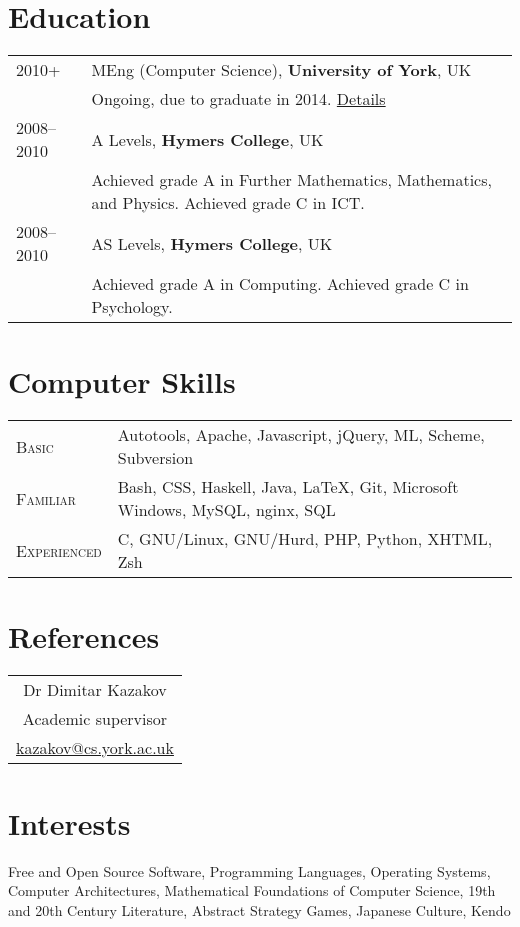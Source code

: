 \documentclass[a4paper,10pt]{article}
\newcommand{\mhref}[1]{\href{mailto:#1}{#1}}
\newenvironment{cvtable}{\begin{tabular}{x{2cm}|p{11.6cm}}}{\end{tabular}}
\newcommand{\rowhead}[1]{\textsc{#1} &}
\newcommand{\rowdetail}[1]{& \footnotesize{#1}}
\newcommand{\details}[1]{\hfill \hyperlink{details:#1}{\footnotesize Details}}
\begin{document}
\section{Education}
\begin{cvtable}
  \rowhead{2010+}       MEng (Computer Science), \textbf{University of York}, UK\\
  \rowdetail{Ongoing, due to graduate in 2014.} \details{csyork}\\

  \rowhead{2008--2010} A Levels, \textbf{Hymers College}, UK\\
  \rowdetail{Achieved grade A in Further Mathematics, Mathematics, and Physics. Achieved grade C in ICT.}\\

  \rowhead{2008--2010} AS Levels, \textbf{Hymers College}, UK\\
  \rowdetail{Achieved grade A in Computing. Achieved grade C in Psychology.}
\end{cvtable}

\section{Computer Skills}
\begin{cvtable}
  \rowhead{Basic}       Autotools, Apache, Javascript, jQuery, ML, Scheme, Subversion\\
  \rowhead{Familiar}    Bash, CSS, Haskell, Java, {\fb\LaTeX}, Git, Microsoft Windows, MySQL, nginx, SQL\\
  \rowhead{Experienced} C, GNU/Linux, GNU/Hurd, PHP, Python, XHTML, Zsh
\end{cvtable}

\section{References}
\begin{tabular}{c}
  Dr Dimitar Kazakov\\
  Academic supervisor\\
  \mhref{kazakov@cs.york.ac.uk}\\
\end{tabular}

\section{Interests}
Free and Open Source Software, Programming Languages, Operating Systems, Computer Architectures, Mathematical Foundations of Computer Science, 19th and 20th Century Literature, Abstract Strategy Games, Japanese Culture, Kendo
\end{document}

